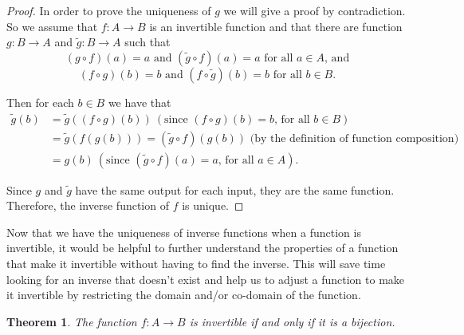 \documentclass[
]{book}
\newtheorem{theorem}{Theorem}[chapter]
\theoremstyle{definition}
\theoremstyle{definition}
\theoremstyle{definition}
\theoremstyle{remark}
\begin{document}
\begin{proof}
{}In order to prove the uniqueness of \(g\) we will give a proof by contradiction. So we assume that \(f:A\rightarrow B\) is an invertible function and that there are function \(g:B\rightarrow A\) and \(\tilde{g}:B\rightarrow A\) such that
\[(g\circ f) (a)=a \mbox{ and } (\tilde{g}\circ f)(a) = a \mbox{ for all } a \in A \mbox{, and}\]
\[(f\circ g)(b)=b \mbox{ and } (f\circ \tilde{g})(b)=b \mbox{ for all } b\in B.\]

Then for each \(b\in B\) we have that
\begin{align*}
\tilde{g}(b) &= \tilde{g}\left( (f\circ g)(b)\right) \: (\mbox{since } (f\circ g)(b)=b \mbox{, for all } b \in B) \\
&= \tilde{g}\left(f(g(b))\right) = (\tilde{g} \circ f)(g(b)) \mbox{ (by the definition of function composition)} \\
&= g(b) \: (\mbox{since } (\tilde{g}\circ f)(a)=a \mbox{, for all } a\in A).
\end{align*}

Since \(g\) and \(\tilde{g}\) have the same output for each input, they are the same function. Therefore, the inverse function of \(f\) is unique.
\end{proof}

Now that we have the uniqueness of inverse functions when a function is invertible, it would be helpful to further understand the properties of a function that make it invertible without having to find the inverse. This will save time looking for an inverse that doesn't exist and help us to adjust a function to make it invertible by restricting the domain and/or co-domain of the function.

\begin{theorem}
\protect\hypertarget{thm:bijection}{}{\label{thm:bijection} }The function \(f:A \rightarrow B\) is invertible if and only if it is a bijection.
\end{theorem}
\end{document}
